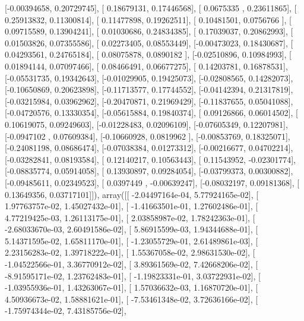 \documentclass{article}
\begin{document}
       [-0.00394658,  0.20729745],
       [ 0.18679131,  0.17446568],
       [ 0.0675335 ,  0.23611865],
       [ 0.25913832,  0.11300814],
       [ 0.11477898,  0.19262511],
       [ 0.10481501,  0.0756766 ],
       [ 0.09715589,  0.13904241],
       [ 0.01030686,  0.24834385],
       [ 0.17039037,  0.20862993],
       [ 0.01503826,  0.07355586],
       [ 0.02273405,  0.08553449],
       [-0.00473023,  0.18430687],
       [ 0.04293561,  0.24765184],
       [ 0.08075878,  0.0890182 ],
       [-0.02510896,  0.10984993],
       [ 0.01894144,  0.07097466],
       [ 0.08466491,  0.06677275],
       [ 0.14203781,  0.16878531],
       [-0.05531735,  0.19342643],
       [-0.01029905,  0.19425073],
       [-0.02808565,  0.14282073],
       [-0.10650869,  0.20623898],
       [-0.11713577,  0.17744552],
       [-0.04142394,  0.21317819],
       [-0.03215984,  0.03962962],
       [-0.20470871,  0.21969429],
       [-0.11837655,  0.05041088],
       [-0.04720576,  0.13330354],
       [-0.05615884,  0.19840374],
       [ 0.09126866,  0.06014502],
       [ 0.10619075,  0.09249603],
       [-0.01228483,  0.02096109],
       [-0.07605349,  0.12207981],
       [-0.0947102 ,  0.07609384],
       [-0.10660928,  0.0819962 ],
       [-0.00853769,  0.18325071],
       [-0.24081198,  0.08686474],
       [-0.07038384,  0.01273312],
       [-0.00216677,  0.04702214],
       [-0.03282841,  0.08193584],
       [ 0.12140217,  0.10563443],
       [ 0.11543952, -0.02301774],
       [-0.08835774,  0.05914058],
       [ 0.13930897,  0.09284054],
       [-0.03799373,  0.00300882],
       [-0.09485611,  0.02349523],
       [ 0.0397449 , -0.00639247],
       [-0.08032197,  0.09181368],
       [ 0.13649356,  0.03717101]]), array([[ -2.04497164e-04,   5.77924165e-02],
       [  1.97763757e-02,   1.45027432e-01],
       [ -1.41663501e-01,   1.27602486e-01],
       [  4.77219425e-03,   1.26113175e-01],
       [  2.03858987e-02,   1.78242363e-01],
       [ -2.68033670e-03,   2.60491586e-02],
       [  5.86915599e-03,   1.94344688e-01],
       [  5.14371595e-02,   1.65811170e-01],
       [ -1.23055729e-01,   2.61489861e-03],
       [  2.23156283e-02,   1.39718222e-01],
       [  1.55367058e-02,   2.98631530e-02],
       [ -1.04522566e-01,   3.36770912e-02],
       [  3.89361569e-02,   7.42668206e-02],
       [ -8.91595171e-02,   1.23762483e-01],
       [ -1.19823331e-01,   3.03722931e-02],
       [ -1.03955936e-01,   1.43263067e-01],
       [  1.57036632e-03,   1.16870720e-01],
       [  4.50936673e-02,   1.58881621e-01],
       [ -7.53461348e-02,   3.72636166e-02],
       [ -1.75974344e-02,   7.43185756e-02],
\end{document}
